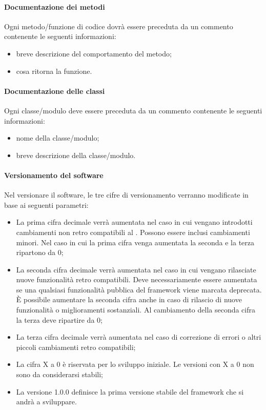 \paragraph{Documentazione dei metodi}

Ogni metodo/funzione di codice dovrà essere preceduta da un commento contenente le seguenti informazioni:
\begin{itemize}
\item {} breve descrizione del comportamento del metodo;
\item {} cosa ritorna la funzione.
\end{itemize}

\paragraph{Documentazione delle classi}

Ogni classe/modulo deve essere preceduta da un commento contenente le seguenti informazioni:
\begin{itemize}
\item {} nome della classe/modulo;
\item {} breve descrizione della classe/modulo.
\end{itemize}

\paragraph{Versionamento del software}

Nel versionare il software, le tre cifre di versionamento verranno modificate in base ai seguenti parametri:
\begin{itemize}
\item La prima cifra decimale verrà aumentata nel caso in cui vengano introdotti cambiamenti non retro compatibili al . Possono essere inclusi cambiamenti minori. Nel caso in cui la prima cifra venga aumentata la seconda e la terza ripartono da 0;
\item La seconda cifra decimale verrà aumentata nel caso in cui vengano rilasciate nuove funzionalità retro compatibili. Deve necessariamente essere aumentata se una qualsiasi funzionalità pubblica del framework viene marcata deprecata. È possibile aumentare la seconda cifra anche in caso di rilascio di nuove funzionalità o miglioramenti sostanziali. Al cambiamento della seconda cifra la terza deve ripartire da 0;
\item La terza cifra decimale verrà aumentata nel caso di correzione di errori o altri piccoli cambiamenti retro compatibili;
\item La cifra X a 0 è riservata per lo sviluppo iniziale. Le versioni con X a 0 non sono da considerarsi stabili;
\item La versione 1.0.0 definisce la prima versione stabile del framework che si andrà a sviluppare.
\end{itemize}

